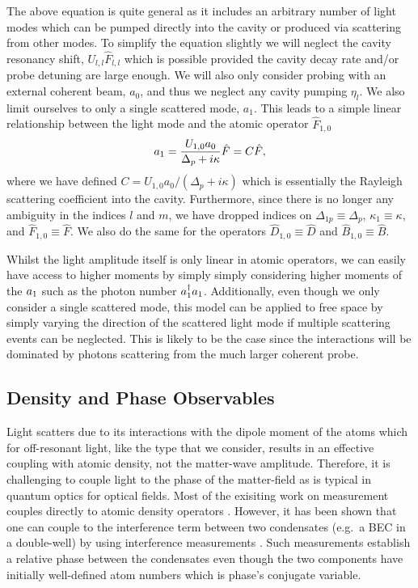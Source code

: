 The above equation is quite general as it includes an arbitrary number
of light modes which can be pumped directly into the cavity or
produced via scattering from other modes. To simplify the equation
slightly we will neglect the cavity resonancy shift, $U_{l,l}
\hat{F}_{l,l}$ which is possible provided the cavity decay rate and/or
probe detuning are large enough. We will also only consider probing
with an external coherent beam, $a_0$, and thus we neglect any cavity
pumping $\eta_l$. We also limit ourselves to only a single scattered
mode, $a_1$. This leads to a simple linear relationship between the
light mode and the atomic operator $\hat{F}_{1,0}$
\begin{equation}
  a_1 = \frac{U_{1,0} a_0} {\Delta_{p} + i \kappa} \hat{F} =
  C \hat{F},
\end{equation}
where we have defined $C = U_{1,0} a_0 / (\Delta_{p} + i \kappa)$
which is essentially the Rayleigh scattering coefficient into the
cavity. Furthermore, since there is no longer any ambiguity in the
indices $l$ and $m$, we have dropped indices on $\Delta_{1p} \equiv
\Delta_p$, $\kappa_1 \equiv \kappa$, and $\hat{F}_{1,0} \equiv
\hat{F}$. We also do the same for the operators $\hat{D}_{1,0} \equiv
\hat{D}$ and $\hat{B}_{1,0} \equiv \hat{B}$.

Whilst the light amplitude itself is only linear in atomic operators,
we can easily have access to higher moments by simply simply
considering higher moments of the $a_1$ such as the photon number
$a^\dagger_1 a_1$. Additionally, even though we only consider a single
scattered mode, this model can be applied to free space by simply
varying the direction of the scattered light mode if multiple
scattering events can be neglected. This is likely to be the case
since the interactions will be dominated by photons scattering from
the much larger coherent probe.

\subsection{Density and Phase Observables}

Light scatters due to its interactions with the dipole moment of the
atoms which for off-resonant light, like the type that we consider,
results in an effective coupling with atomic density, not the
matter-wave amplitude. Therefore, it is challenging to couple light to
the phase of the matter-field as is typical in quantum optics for
optical fields. Most of the exisiting work on measurement couples
directly to atomic density operators \cite{mekhov2012, LP2009,
  rogers2014, ashida2015, ashida2015a}. However, it has been shown
that one can couple to the interference term between two condensates
(e.g.~a BEC in a double-well) by using interference measurements
\cite{cirac1996, castin1997, ruostekoski1997, ruostekoski1998,
  rist2012}. Such measurements establish a relative phase between the
condensates even though the two components have initially well-defined
atom numbers which is phase's conjugate variable.

